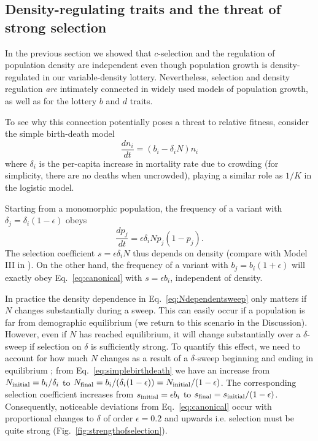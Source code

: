 \documentclass[12pt]{article}
\begin{document}
\subsection*{Density-regulating traits and the threat of strong selection}

In the previous section we showed that $c$-selection and the regulation of population density are independent even though population growth is density-regulated in our variable-density lottery. Nevertheless, selection and density regulation \textit{are} intimately connected in widely used models of population growth, as well as for the lottery $b$ and $d$ traits.

To see why this connection potentially poses a threat to relative fitness, consider the simple birth-death model \cite[pp. 20]{kostitzin_1939} \citep{travis_2013} 
\begin{equation}
\frac{d n_i}{dt}=(b_i -\delta_iN) n_i \label{eq:simplebirthdeath}
\end{equation}
where $\delta_i$ is the per-capita increase in mortality rate due to crowding (for simplicity, there are no deaths when uncrowded), playing a similar role as $1/K$ in the logistic model. 

Starting from a monomorphic population, the frequency of a variant with $\delta_j=\delta_i(1-\epsilon)$ obeys 
\begin{equation}
\frac{d p_j}{dt}=\epsilon \delta_i N p_j(1-p_j). \label{eq:Ndependentsweep}
\end{equation}
The selection coefficient $s=\epsilon \delta_i N$ thus depends on density (compare with Model III in \cite{kimura1969natural}). On the other hand, the frequency of a variant with $b_j= b_i(1+\epsilon)$ will exactly obey Eq.~\eqref{eq:canonical} with $s=\epsilon b_i$, independent of density.

In practice the density dependence in Eq.~\eqref{eq:Ndependentsweep} only matters if $N$ changes substantially during a sweep. This can easily occur if a population is far from demographic equilibrium (we return to this scenario in the Discussion). However, even if $N$ has reached equilibrium, it will change substantially over a $\delta$-sweep if selection on $\delta$ is sufficiently strong. To quantify this effect, we need to account for how much $N$ changes as a result of a $\delta$-sweep beginning and ending in equilibrium \citep{kimura1969natural}; from Eq.~\eqref{eq:simplebirthdeath} we have an increase from $N_{\rm initial}=b_i/\delta_i$ to $N_{\rm final}=b_i/(\delta_i(1-\epsilon))=N_{\rm initial}/(1-\epsilon)$. The corresponding selection coefficient increases from $s_{\rm initial}= \epsilon b_i$ to $s_{\rm final}=s_{\rm initial}/(1-\epsilon)$. Consequently, noticeable deviations from Eq.~\eqref{eq:canonical} occur with proportional changes to $\delta$ of order $\epsilon=0.2$ and upwards i.e. selection must be quite strong (Fig.~\ref{fig:strengthofselection}). 
\end{document}
